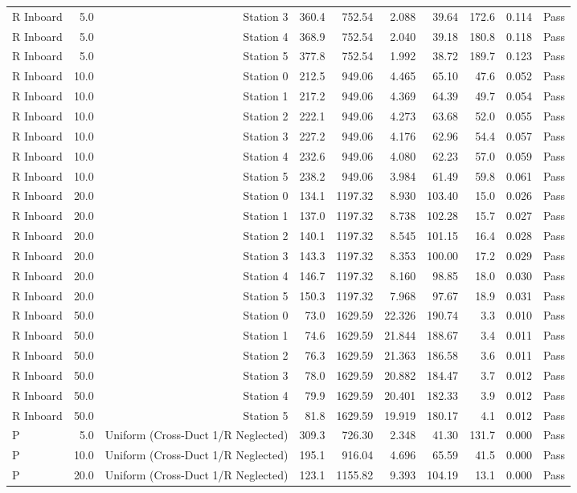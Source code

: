 \begin{tabular}{lrrrrrrrrr}
R Inboard & 5.0 & Station 3 & 360.4 & 752.54 & 2.088 & 39.64 & 172.6 & 0.114 & Pass \\
R Inboard & 5.0 & Station 4 & 368.9 & 752.54 & 2.040 & 39.18 & 180.8 & 0.118 & Pass \\
R Inboard & 5.0 & Station 5 & 377.8 & 752.54 & 1.992 & 38.72 & 189.7 & 0.123 & Pass \\
R Inboard & 10.0 & Station 0 & 212.5 & 949.06 & 4.465 & 65.10 & 47.6 & 0.052 & Pass \\
R Inboard & 10.0 & Station 1 & 217.2 & 949.06 & 4.369 & 64.39 & 49.7 & 0.054 & Pass \\
R Inboard & 10.0 & Station 2 & 222.1 & 949.06 & 4.273 & 63.68 & 52.0 & 0.055 & Pass \\
R Inboard & 10.0 & Station 3 & 227.2 & 949.06 & 4.176 & 62.96 & 54.4 & 0.057 & Pass \\
R Inboard & 10.0 & Station 4 & 232.6 & 949.06 & 4.080 & 62.23 & 57.0 & 0.059 & Pass \\
R Inboard & 10.0 & Station 5 & 238.2 & 949.06 & 3.984 & 61.49 & 59.8 & 0.061 & Pass \\
R Inboard & 20.0 & Station 0 & 134.1 & 1197.32 & 8.930 & 103.40 & 15.0 & 0.026 & Pass \\
R Inboard & 20.0 & Station 1 & 137.0 & 1197.32 & 8.738 & 102.28 & 15.7 & 0.027 & Pass \\
R Inboard & 20.0 & Station 2 & 140.1 & 1197.32 & 8.545 & 101.15 & 16.4 & 0.028 & Pass \\
R Inboard & 20.0 & Station 3 & 143.3 & 1197.32 & 8.353 & 100.00 & 17.2 & 0.029 & Pass \\
R Inboard & 20.0 & Station 4 & 146.7 & 1197.32 & 8.160 & 98.85 & 18.0 & 0.030 & Pass \\
R Inboard & 20.0 & Station 5 & 150.3 & 1197.32 & 7.968 & 97.67 & 18.9 & 0.031 & Pass \\
R Inboard & 50.0 & Station 0 & 73.0 & 1629.59 & 22.326 & 190.74 & 3.3 & 0.010 & Pass \\
R Inboard & 50.0 & Station 1 & 74.6 & 1629.59 & 21.844 & 188.67 & 3.4 & 0.011 & Pass \\
R Inboard & 50.0 & Station 2 & 76.3 & 1629.59 & 21.363 & 186.58 & 3.6 & 0.011 & Pass \\
R Inboard & 50.0 & Station 3 & 78.0 & 1629.59 & 20.882 & 184.47 & 3.7 & 0.012 & Pass \\
R Inboard & 50.0 & Station 4 & 79.9 & 1629.59 & 20.401 & 182.33 & 3.9 & 0.012 & Pass \\
R Inboard & 50.0 & Station 5 & 81.8 & 1629.59 & 19.919 & 180.17 & 4.1 & 0.012 & Pass \\
P & 5.0 & Uniform (Cross-Duct 1/R Neglected) & 309.3 & 726.30 & 2.348 & 41.30 & 131.7 & 0.000 & Pass \\
P & 10.0 & Uniform (Cross-Duct 1/R Neglected) & 195.1 & 916.04 & 4.696 & 65.59 & 41.5 & 0.000 & Pass \\
P & 20.0 & Uniform (Cross-Duct 1/R Neglected) & 123.1 & 1155.82 & 9.393 & 104.19 & 13.1 & 0.000 & Pass \\
\bottomrule
\end{tabular}
